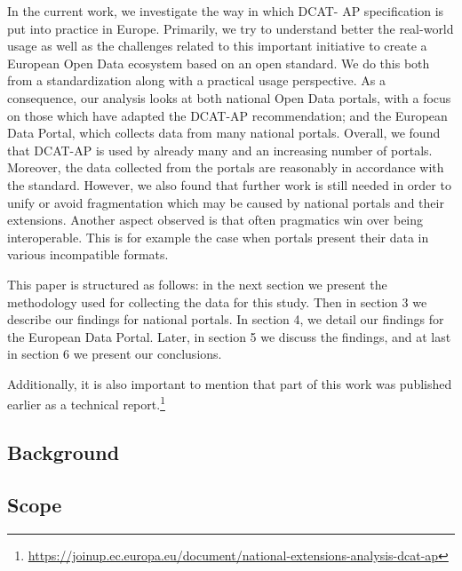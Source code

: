 \documentclass[<options>]{elsarticle}
\begin{document}
In the current work, we investigate the way in which DCAT- AP specification is put into practice in Europe. Primarily, we try to understand better the real-world usage as well as the challenges related to this important initiative to create a European Open Data ecosystem based on an open standard. We do this both from a standardization along with a practical usage perspective. As a consequence, our analysis looks at both national Open Data portals, with a focus on those which have adapted the DCAT-AP recommendation; and the European Data Portal, which collects data from many national portals. Overall, we found that DCAT-AP is used by already many and an increasing number of portals. Moreover, the data collected from the portals are reasonably in accordance with the standard. However, we also found that further work is still needed in order to unify or avoid fragmentation which may be caused by national portals and their extensions. Another aspect observed is that often pragmatics win over being interoperable. This is for example the case when portals present their data in various incompatible formats.

This paper is structured as follows: in the next section we present the methodology used for collecting the data for this study. Then in section 3 we describe our findings for national portals. In section 4, we detail our findings for the European Data Portal. Later, in section 5 we discuss the findings, and at last in section 6 we present our conclusions. 

Additionally, it is also important to mention that part of this  work was published earlier as a technical report.\footnote{\href{https://joinup.ec.europa.eu/document/national-extensions-analysis-dcat-ap}{https://joinup.ec.europa.eu/document/national-extensions-analysis-dcat-ap}}
\subsection{Background}


\subsection{Scope}
\end{document}
